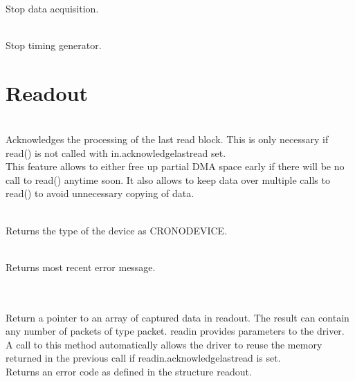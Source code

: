 				\\
				Stop data acquisition.\par
	
				\\
				Stop timing generator.\par
	
		\section{Readout\label{cp:readout}}
	
			 \\
			Acknowledges the processing of the last read block. This is only necessary if \textsf{\prefix read()} is not called with 
			\textsf{in.acknowledge\tu last\tu read} set.\\
			This feature allows to either free up partial DMA space early if there will be no call to \textsf{\prefix read()} anytime soon. 
			It also allows to keep data over multiple calls to \textsf{\prefix read()} to avoid unnecessary copying of data. \par
	
			\\
			Returns the type of the device as \textsf{CRONO\tu DEVICE\tu {}}.\par
	
			\\
			Returns most recent error message.\par
	
			  \\ \\
			Return a pointer to an array of captured data in \textsf{read\tu out}. 
			The result can contain any number of packets of type \textsf{\prefix packet}.
			\textsf{read\tu in} provides parameters to the driver. 
			A call to this method automatically allows the driver to reuse the memory returned in the previous call if \textsf{read\tu in.acknowledge\tu last\tu read} is set.\\
			Returns an error code as defined in the structure \textsf{\prefix read\tu out}.
	
